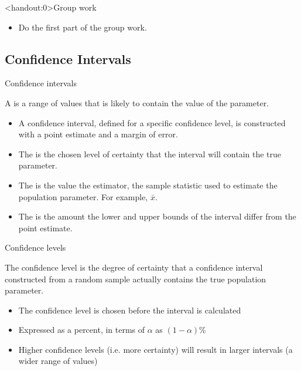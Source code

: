 \documentclass[xcolor=table, aspectratio=169, bigger]{beamer}
\begin{document}
\begin{frame}<handout:0>{Group work}
\begin{block}{}
\large
\begin{itemize}
\item Do the first part of the group work.
\end{itemize}
\end{block}
\end{frame}

%
%
\subsection{Confidence Intervals}

\begin{frame}{Confidence intervals}
\begin{block}{}
A  is a range of values that is likely to contain the value of the parameter.

\begin{itemize}
\item A confidence interval, defined for a specific confidence level, is constructed with a point estimate and a margin of error.
\item  The  is the chosen level of certainty that the interval will contain the true parameter. 
\item The  is the value the estimator, the sample statistic used to estimate the population parameter. For example, $\bar x$.
\item The  is the amount the lower and upper bounds of the interval differ from the point estimate.
\end{itemize}
\end{block}
\end{frame}

\begin{frame}{Confidence levels}

\begin{block}{}
The confidence level is the degree of certainty that a confidence interval constructed from a random sample actually contains the true population parameter.\\
\begin{itemize}
\pause\item The confidence level is chosen before the interval is calculated
\pause\item Expressed as a percent, in terms of $\alpha$ as $(1-\alpha)\%$
\pause\item Higher confidence levels (i.e. more certainty) will result in larger intervals (a wider range of values)
\end{itemize} 
\end{block}

\end{frame}
\end{document}
